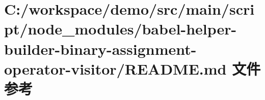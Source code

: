 \hypertarget{node__modules_2babel-helper-builder-binary-assignment-operator-visitor_2_r_e_a_d_m_e_8md}{}\section{C\+:/workspace/demo/src/main/script/node\+\_\+modules/babel-\/helper-\/builder-\/binary-\/assignment-\/operator-\/visitor/\+R\+E\+A\+D\+ME.md 文件参考}
\label{node__modules_2babel-helper-builder-binary-assignment-operator-visitor_2_r_e_a_d_m_e_8md}
